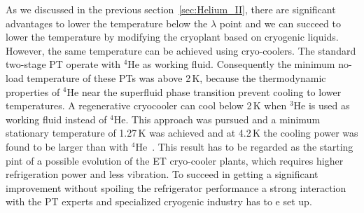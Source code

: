 As we discussed in the previous section~\ref{sec:Helium_II}, there are significant advantages to lower the temperature below the $\lambda$ point and we can succeed to lower the temperature by modifying  the cryoplant based on cryogenic liquids. However, the same temperature can be achieved using cryo-coolers.  The standard two-stage PT  operate with ${}^4$He as working fluid. Consequently the minimum no-load temperature of these PTs was above 2\,K, because the thermodynamic properties of ${}^4$He near the superfluid phase transition prevent cooling to lower temperatures. A regenerative cryocooler can cool below 2\,K when ${}^3$He is used as working fluid instead of ${}^4$He. This approach was pursued and  a minimum stationary temperature of 1.27\,K  was achieved and  at 4.2\,K  the cooling power  was found to be larger than with ${}^4$He~\cite{Thummes}. This result has to be regarded as the starting pint of a possible evolution of the ET cryo-cooler plants, which requires higher refrigeration power and less vibration.
 To succeed in getting a significant improvement without spoiling the refrigerator performance a strong interaction with the PT experts and specialized cryogenic industry has to e set up.

















